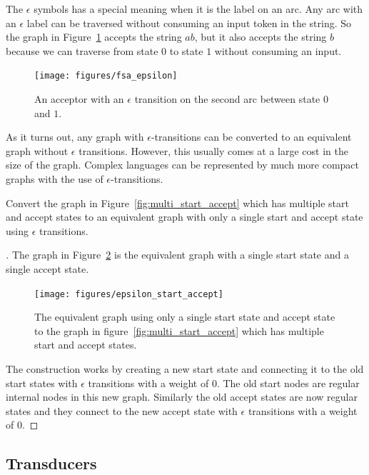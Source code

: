 The $\epsilon$ symbols has a special meaning when it is the label on an arc.
Any arc with an $\epsilon$ label can be traversed without consuming an input
token in the string. So the graph in Figure~\ref{fig:fsa_epsilon} accepts the
string $ab$, but it also accepts the string $b$ because we can traverse from
state $0$ to state $1$ without consuming an input.

\begin{figure}
    \centering
    \texttt{[image: figures/fsa\_epsilon]}
    \caption{An acceptor with an $\epsilon$ transition on the second arc
    between state $0$ and $1$.}
    \label{fig:fsa_epsilon}
\end{figure}

As it turns out, any graph with $\epsilon$-transitions can be converted to an
equivalent graph without $\epsilon$ transitions. However, this usually comes at
a large cost in the size of the graph. Complex languages can be represented by
much more compact graphs with the use of $\epsilon$-transitions.

\begin{example}
Convert the graph in Figure~\ref{fig:multi_start_accept} which has multiple
start and accept states to an equivalent graph with only a single start and
accept state using $\epsilon$ transitions.
\end{example}

\begin{proof}[\unskip\nopunct]
The graph in Figure~\ref{fig:epsilon_start_accept} is the equivalent graph
with a single start state and a single accept state.

\begin{figure}
    \centering
    \texttt{[image: figures/epsilon\_start\_accept]}
    \caption{The equivalent graph using only a single start state and accept
    state to the graph in figure~\ref{fig:multi_start_accept} which has
    multiple start and accept states.}
    \label{fig:epsilon_start_accept}
\end{figure}

The construction works by creating a new start state and connecting it to the
old start states with $\epsilon$ transitions with a weight of $0$. The old
start nodes are regular internal nodes in this new graph. Similarly the old
accept states are now regular states and they connect to the new accept state
with $\epsilon$ transitions with a weight of $0$.
\end{proof}

\subsection{Transducers}

